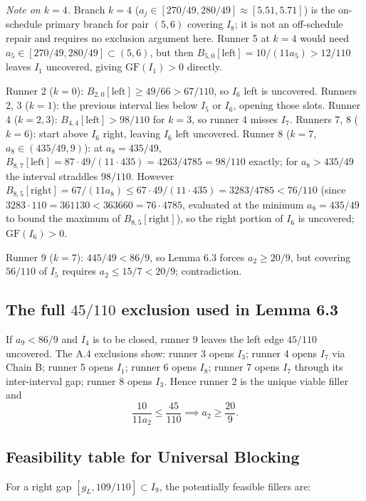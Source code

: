 \documentclass[12pt]{article}
\begin{document}
\emph{Note on $k=4$.} Branch $k=4$ ($a_j\in[270/49,280/49]\approx[5.51,5.71]$) is the
on-schedule primary branch for pair $(5,6)$ covering $I_8$; it is not an off-schedule
repair and requires no exclusion argument here. Runner 5 at $k=4$ would need
$a_5\in[270/49,280/49]\subset(5,6)$, but then $B_{5,0}[\mathrm{left}]=10/(11a_5)>12/110$
leaves $I_1$ uncovered, giving $\mathrm{GF}(I_1)>0$ directly.

Runner 2 ($k=0$): $B_{2,0}[\mathrm{left}]\ge 49/66>67/110$, so $I_6$ left is uncovered.
Runners 2, 3 ($k=1$): the previous interval lies below $I_5$ or $I_6$, opening those slots.
Runner 4 ($k=2,3$): $B_{4,4}[\mathrm{left}]>98/110$ for $k=3$, so runner 4 misses $I_7$.
Runners 7, 8 ($k=6$): start above $I_6$ right, leaving $I_6$ left uncovered.
Runner 8 ($k=7$, $a_8\in(435/49,9)$): at $a_8=435/49$, $B_{8,7}[\mathrm{left}]=
87\cdot49/(11\cdot435)=4263/4785=98/110$ exactly; for $a_8>435/49$ the interval
straddles $98/110$. However $B_{8,5}[\mathrm{right}]=67/(11a_8)\le 67\cdot49/(11\cdot435)=3283/4785<76/110$
(since $3283\cdot110=361130<363660=76\cdot4785$, evaluated at the minimum
$a_8=435/49$ to bound the maximum of $B_{8,5}[\mathrm{right}]$),
so the right portion of $I_6$ is uncovered;
$\mathrm{GF}(I_6)>0$.

Runner 9 ($k=7$): $445/49<86/9$, so Lemma 6.3 forces $a_2\ge 20/9$,
but covering $56/110$ of $I_5$ requires $a_2\le 15/7<20/9$; contradiction.

\subsection{The full $45/110$ exclusion used in Lemma 6.3}

If $a_9<86/9$ and $I_4$ is to be closed, runner 9 leaves the left edge $45/110$ uncovered.
The A.4 exclusions show:
runner 3 opens $I_3$; runner 4 opens $I_7$ via Chain B; runner 5 opens $I_1$;
runner 6 opens $I_8$; runner 7 opens $I_7$ through its inter-interval gap; runner 8 opens $I_3$.
Hence runner 2 is the unique viable filler and
\[
\frac{10}{11a_2} \le \frac{45}{110} \implies a_2 \ge \frac{20}{9}.
\]

\subsection{Feasibility table for Universal Blocking}

For a right gap $[g_L,109/110]\subset I_9$, the potentially feasible fillers are:
\end{document}
